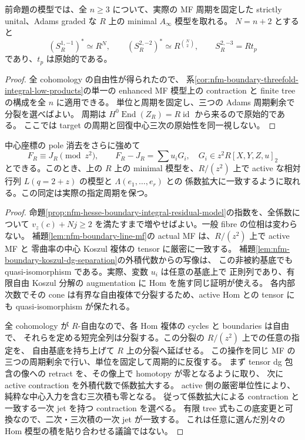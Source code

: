 \begin{corollary}
\label{cor:nfm-boundary-alln-integral-products}
前命題の模型では、全 $n\ge3$ について、実際の MF 周期を固定した
strictly unital、Adams graded な $R$ 上の minimal $A_\infty$ 模型を取れる。
$N=n+2$ とすると
\[
 (S_R^{1,-1})^*\simeq R^N,\qquad
 (S_R^{2,-2})^*\simeq R^{\binom N2},\qquad
 S_R^{2,-3}=Rt_p
\]
であり、$t_p$ は原始的である。
\end{corollary}
\begin{proof}
全 cohomology の自由性が得られたので、
系\ref{cor:nfm-boundary-threefold-integral-low-products}の単一の enhanced MF 模型上の
contraction と finite tree の構成を全 $n$ に適用できる。
単位と周期を固定し、三つの Adams 周期剰余で分裂を選べばよい。
周期は $H^0\operatorname{End}(Z_R)=R\operatorname{id}$ から来るので原始的である。
ここでは target の周期と回復中心三次の原始性を同一視しない。
\end{proof}

\begin{lemma}
\label{lem:nfm-boundary-full-active-first-jet}
中心座標の pole 消去をさらに強めて
\[
 F_R\equiv J_R\pmod{z^2},\qquad F_R-J_R=\sum u_iG_i,\quad G_i\in z^2R[X,Y,Z,u]_2
\]
とできる。このとき、上の $R$ 上の minimal 模型を、$R/(z^2)$ 上で
active な相対行列 $L(q=2+z)$ の模型と $\Lambda(e_1,\ldots,e_r)$ との
係数拡大に一致するように取れる。この同定は実際の指定周期を保つ。
\end{lemma}
\begin{proof}
命題\ref{prop:nfm-hesse-boundary-integral-residual-model}の指数を、全係数について
$v_z(c)+Nj\ge2$ を満たすまで増やせばよい。一般 fibre の位相は変わらない。
補題\ref{lem:nfm-boundary-line-mf}の actual MF は、$R/(z^2)$ 上で active MF と
零曲率の中心 Koszul 複体の tensor に厳密に一致する。
補題\ref{lem:nfm-boundary-koszul-dg-separation}の外積代数からの写像は、
この非被約基底でも quasi-isomorphism である。実際、変数 $u_i$ は任意の基底上で
正則列であり、有限自由 Koszul 分解の augmentation に Hom を施す同じ証明が使える。
各内部次数でその cone は有界な自由複体で分裂するため、active Hom との tensor にも
quasi-isomorphism が保たれる。

全 cohomology が $R$-自由なので、各 Hom 複体の cycles と boundaries は自由で、
それらを定める短完全列は分裂する。この分裂の $R/(z^2)$ 上での任意の指定を、
自由基底を持ち上げて $R$ 上の分裂へ延ばせる。
この操作を同じ MF の三つの周期剰余で行い、単位を固定して周期的に反復する。
まず tensor dg 包含の像への retract を、その像上で homotopy が零となるように取り、
次に active contraction を外積代数で係数拡大する。
active 側の厳密単位性により、純粋な中心入力を含む三次積も零となる。
従って係数拡大による contraction と一致する一次 jet を持つ contraction を選べる。
有限 tree 式もこの底変更と可換なので、二次・三次積の一次 jet が一致する。
これは任意に選んだ別々の Hom 模型の積を貼り合わせる議論ではない。
\end{proof}

